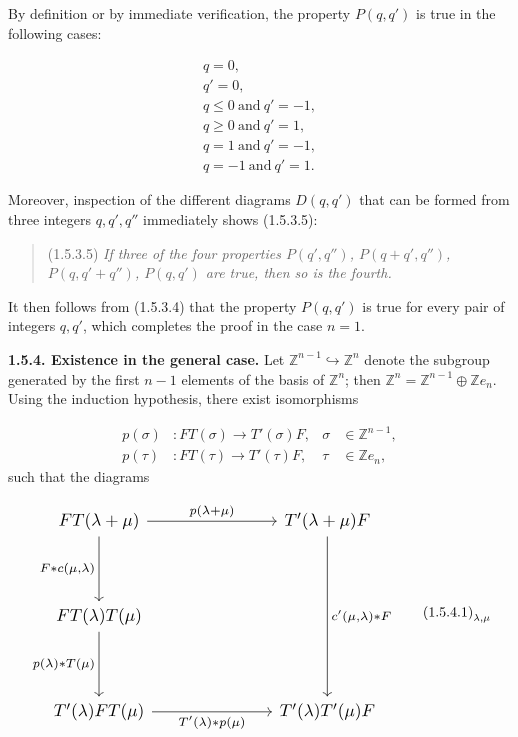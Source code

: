%
By definition or by immediate verification, the property $P(q,q')$
is true in the following cases:

\begin{equation}
  \begin{gathered}
    q=0,\\
    q'=0,\\
    q\leq 0\ \text{and}\ q'=-1,\\
    q\geq 0\ \text{and}\ q'=1,\\
    q=1\ \text{and}\ q'=-1,\\
    q=-1\ \text{and}\ q'=1.
  \end{gathered}
  \tag{1.5.3.4}
\end{equation}

Moreover, inspection of the different diagrams $D(q,q')$ that can be
formed from three integers $q,q',q''$ immediately shows (1.5.3.5):

\begin{quote}
  \noindent\textup{(1.5.3.5)}\quad
  \emph{If three of the four properties
  $P(q',q'')$, $P(q+q',q'')$, $P(q,q'+q'')$, $P(q,q')$ are true,
  then so is the fourth.}
\end{quote}

It then follows from (1.5.3.4) that the property $P(q,q')$ is true
for every pair of integers $q,q'$, which completes the proof in the
case $n=1$.

\noindent\textbf{1.5.4. Existence in the general case.}\quad
Let $\mathbb Z^{n-1}\hookrightarrow\mathbb Z^n$ denote the subgroup
generated by the first $n-1$ elements of the basis of $\mathbb Z^n$;
then $\mathbb Z^n=\mathbb Z^{n-1}\oplus\mathbb Z e_n$.
Using the induction hypothesis, there exist isomorphisms

\[
  \begin{aligned}
    p(\sigma)&\colon FT(\sigma)\longrightarrow T'(\sigma)F,
      &\sigma&\in\mathbb Z^{n-1},\\
    p(\tau)&\colon FT(\tau)\longrightarrow T'(\tau)F,
      &\tau&\in\mathbb Z e_n,
  \end{aligned}
\]
such that the diagrams

\begin{equation}
  \resizebox{0.76\textwidth}{!}{%
    $\begin{tikzcd}[ampersand replacement=\&,column sep=7.0em,row sep=3.8em]
      FT(\lambda+\mu)
        \arrow[r,"{p(\lambda+\mu)}"]
        \arrow[d,"{F*c(\mu,\lambda)}"']
        \& T'(\lambda+\mu)F
        \arrow[dd,"{c'(\mu,\lambda)*F}"] \\
      FT(\lambda)T(\mu)
        \arrow[d,"{p(\lambda)*T(\mu)}"']
        \& {} \\
      T'(\lambda)FT(\mu)
        \arrow[r,"{T'(\lambda)*p(\mu)}"']
        \& T'(\lambda)T'(\mu)F
    \end{tikzcd}$%
  }
  \tag*{\(\textup{(1.5.4.1)}_{\lambda,\mu}\)}
\end{equation}
